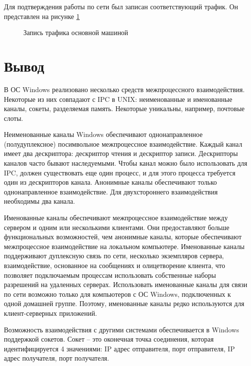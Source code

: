 \documentclass[a4paper]{article}
\begin{document}
	Для подтверждения работы по сети был записан соответствующий трафик. Он представлен на рисунке \ref{img:task9_broad_wire}
	
	\begin{figure}[h!]
		\caption{Запись трафика основной машиной}
		\label{img:task9_broad_wire}
	\end{figure}

\section{Вывод}
	В ОС Windows реализовано несколько средств межпроцессного взаимодействия. Некоторые из них совпадают с IPC в UNIX: неименованные и именованные каналы, сокеты, разделяемая память. Некоторые уникальны, например, почтовые слоты.
	
	Неименованные каналы Windows обеспечивают однонаправленное (полудуплексное) посимвольное межпроцессное взаимодействие. Каждый канал имеет два дескриптора: дескриптор чтения и дескриптор записи. Дескрипторы каналов часто бывают наследуемыми. Чтобы канал можно было использовать для IPC, должен существовать еще один процесс, и для этого процесса требуется один из дескрипторов канала. 
Анонимные каналы обеспечивают только однонаправленное взаимодействие. Для двухстороннего взаимодействия необходимы два канала. 

	Именованные каналы обеспечивают межпроцессное взаимодействие между сервером и одним или несколькими клиентами. Они предоставляют больше функциональных возможностей, чем анонимные каналы, которые обеспечивают межпроцессное взаимодействие на локальном компьютере. Именованные каналы поддерживают дуплексную связь по сети, несколько экземпляров сервера, взаимодействие, основанное на сообщениях и олицетворение клиента, что позволяет подключаемым процессам использовать собственные наборы разрешений на удаленных серверах. Использовать именованные каналы для связи по сети возможно только для компьютеров с ОС Windows, подключенных к одной домашней группе. Поэтому, именованные каналы редко используются для клиент-серверных приложений.
	
	Возможность взаимодействия с другими системами обеспечивается в Windows поддержкой сокетов. Сокет – это оконечная точка соединения, которая идентифицируется 4 значениями: IP адрес отправителя, порт отправителя, IP адрес получателя, порт получателя. 
	
\end{document}
